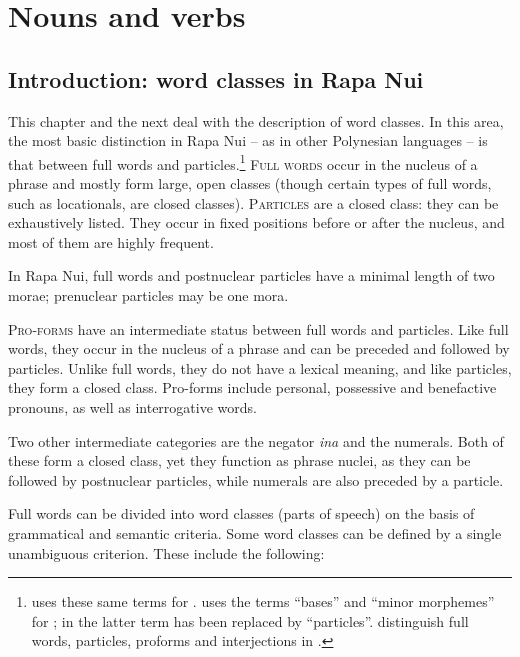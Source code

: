 \chapter[Nouns and verbs]{Nouns and verbs}\label{ch:3}
\section{Introduction: word classes in Rapa Nui}\label{sec:3.1}
This chapter and the next deal with the description of word classes. In this area, the most basic distinction in Rapa Nui – as in other Polynesian languages – is that between full words and particles.\footnote{\label{fn:86}\citet{Buse1965} uses these same terms for . \citet{Biggs1961} uses the terms “bases” and “minor morphemes” for ; in \citet{Biggs1973} the latter term has been replaced by “particles”. \citet[71]{MoselHovdhaugen1992} distinguish full words, particles, proforms and interjections in .} \textsc{Full words} occur in the nucleus of a phrase and mostly form large, open classes (though certain types of full words, such as locationals, are closed classes). \textsc{Particles} are a closed class: they can be exhaustively listed. They occur in fixed positions before or after the nucleus, and most of them are highly frequent.

In Rapa Nui, full words and postnuclear particles have a minimal length of two morae; prenuclear particles may be one mora.

\textsc{Pro-forms} have an intermediate status between full words and particles. Like full words, they occur in the nucleus of a phrase and can be preceded and followed by particles. Unlike full words, they do not have a lexical meaning, and like particles, they form a closed class. Pro-forms include personal, possessive and benefactive pronouns, as well as interrogative words. 

Two other intermediate categories are the negator \textit{{\ꞌ}ina} and the numerals. Both of these form a closed class, yet they function as phrase nuclei, as they can be followed by postnuclear particles, while numerals are also preceded by a particle. 

Full words can be divided into word classes (parts of speech) on the basis of grammatical and semantic criteria. Some word classes can be defined by a single unambiguous criterion. These include the following:

